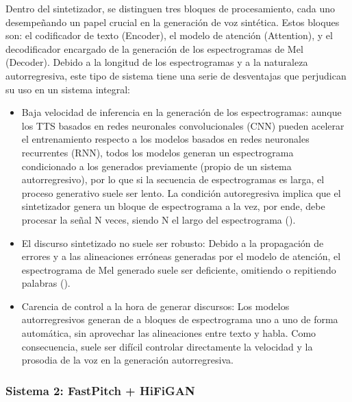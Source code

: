 Dentro del sintetizador, se distinguen tres bloques de procesamiento, cada uno desempeñando un papel crucial en la generación de voz sintética. Estos bloques son: el codificador de texto (Encoder), el modelo de atención (Attention), y el decodificador encargado de la generación de los espectrogramas de Mel (Decoder). 
Debido a la longitud de los espectrogramas y a la naturaleza autorregresiva, este tipo de sistema tiene una serie de desventajas que perjudican su uso en un sistema integral:

\begin{itemize}
    \item Baja velocidad de inferencia en la generación de los espectrogramas: aunque los TTS basados en redes neuronales convolucionales (CNN) pueden acelerar el entrenamiento respecto a los modelos basados en redes neuronales recurrentes (RNN), todos los modelos generan un espectrograma condicionado a los generados previamente (propio de un sistema autorregresivo), por lo que si la secuencia de espectrogramas es larga, el proceso generativo suele ser lento. La condición autoregresiva implica que el sintetizador genera un bloque de espectrograma a la vez, por ende, debe procesar la señal N veces, siendo N el largo del espectrograma (\cite{ren2019}).

    \item El discurso sintetizado no suele ser robusto: Debido a la propagación de errores y a las alineaciones erróneas generadas por el modelo de atención, el espectrograma de Mel generado suele ser deficiente, omitiendo o repitiendo palabras (\cite{wei2018}).

    \item Carencia de control a la hora de generar discursos: Los modelos autorregresivos generan de a bloques de espectrograma uno a uno de forma automática, sin aprovechar las alineaciones entre texto y habla. Como consecuencia, suele ser difícil controlar directamente la velocidad y la prosodia de la voz en la generación autorregresiva. 
    
\end{itemize}

\subsubsection{Sistema 2: FastPitch + HiFiGAN}


